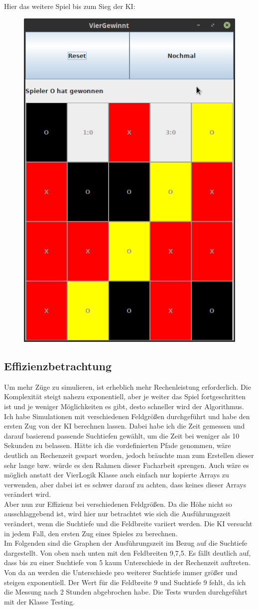 \documentclass[12pt,a4paper,ngerman]{article}
\begin{document}
	Hier das weitere Spiel bis zum Sieg der KI:\\
	\begin{figure}[h]
		\centering
		\includegraphics[width=0.4\linewidth, height=0.3\textheight]{maybe/fach4}
		\caption{}
		\label{fig:fach4}
	\end{figure}
	
	\subsection{Effizienzbetrachtung}
	Um mehr Züge zu simulieren, ist erheblich mehr Rechenleistung erforderlich. Die Komplexität steigt nahezu exponentiell, aber je weiter das Spiel fortgeschritten ist und je weniger Möglichkeiten es gibt, desto schneller wird der Algorithmus. Ich habe Simulationen mit verschiedenen Feldgrößen durchgeführt und habe den ersten Zug von der KI berechnen lassen. Dabei habe ich die Zeit gemessen und darauf basierend passende Suchtiefen gewählt, um die Zeit bei weniger als 10 Sekunden zu belassen. Hätte ich die vordefinierten Pfade genommen, wäre deutlich an Rechenzeit gespart worden, jedoch bräuchte man zum Erstellen dieser sehr lange bzw. würde es den Rahmen dieser Facharbeit sprengen. Auch wäre es möglich anstatt der VierLogik Klasse auch einfach nur kopierte Arrays zu verwenden, aber dabei ist es schwer darauf zu achten, dass keines dieser Arrays verändert wird.\\
	Aber nun zur Effizienz bei verschiedenen Feldgrößen. Da die Höhe nicht so ausschlaggebend ist, wird hier nur betrachtet wie sich die Ausführungszeit verändert, wenn die Suchtiefe und die Feldbreite variiert werden. Die KI versucht in jedem Fall, den ersten Zug eines Spieles zu berechnen.\\
	Im Folgenden sind die Graphen der Ausführungszeit im Bezug auf die Suchtiefe dargestellt. Von oben nach unten mit den Feldbreiten 9,7,5. Es fällt deutlich auf, dass bis zu einer Suchtiefe von 5 kaum Unterschiede in der Rechenzeit auftreten. Von da an werden die Unterschiede pro weiterer Suchtiefe immer größer und steigen exponentiell. Der Wert für die Feldbreite 9 und Suchtiefe 9 fehlt, da ich die Messung nach 2 Stunden abgebrochen habe. Die Tests wurden durchgeführt mit der Klasse Testing.\\
	
\end{document}
